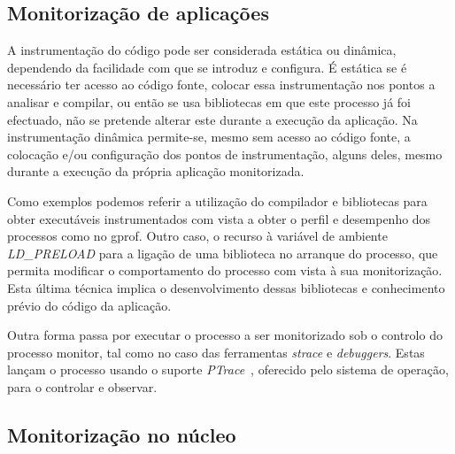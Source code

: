 \documentclass[a4paper]{llncs}
\newcommand{\td}[1]{\todo[inline]{#1}}
\begin{document}
\subsection{Monitorização de aplicações}
\label{sub:user_level_monitor}

A instrumentação do código pode ser considerada estática ou dinâmica, dependendo da facilidade com que se introduz e configura.
 É estática se é necessário ter acesso ao código fonte, colocar essa instrumentação nos pontos a analisar e compilar, ou então se usa bibliotecas em que este processo já foi efectuado, não se pretende alterar este durante a execução da aplicação.
 Na instrumentação dinâmica permite-se, mesmo sem acesso ao código fonte, a colocação e/ou configuração dos pontos de instrumentação, alguns deles, mesmo durante a execução da própria aplicação monitorizada. 


Como exemplos podemos referir a utilização do compilador e bibliotecas para obter executáveis instrumentados com vista a obter o perfil e desempenho dos processos como no gprof\cite{Graham:1982:GCG:800230.806987}.
Outro caso, o recurso à variável de ambiente \textit{LD\_PRELOAD} para a ligação de uma biblioteca no arranque do processo, que permita modificar o comportamento do processo com vista à sua monitorização. Esta última técnica implica o desenvolvimento dessas bibliotecas e conhecimento prévio do código da aplicação.

Outra forma passa por executar o processo a ser monitorizado sob o controlo do processo monitor, tal como no caso das ferramentas \textit{strace} e  \textit{debuggers}.
 Estas lançam o processo usando o suporte \textit{PTrace}~\cite{ptrace}, oferecido pelo sistema de operação, para o controlar e observar.

\subsection{Monitorização no núcleo}
\label{sub_kernel_instrumentation}
\end{document}
